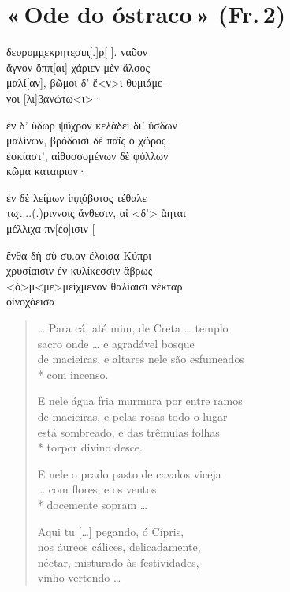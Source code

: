 \pagebreak
\section{«\,Ode do óstraco\,» (Fr.\,2)}

\begin{gkverse}
\dagger{}δευρυμμ̣εκρητε̣σιπ̣[.]ρ[̣ \quad].\dagger{} ναῦον\\
ἄγνον ὄππ̣[αι\quad] χάριεν μὲν ἄλσος\\
μαλί[αν], βῶμοι δ’ ἔ<ν>ι θυμιάμε-\\
νοι [λι]β̣ανώτω<ι>·

ἐν δ’ ὔδωρ ψῦχρον κελάδει δι’ ὔσδων\\
μαλίνων, βρόδοισι δὲ παῖς ὀ χῶρος\\
ἐσκίαστ’, αἰθυσσομένων δὲ φύλλων\\
κῶμα \dagger{}καταιριον·

ἐν δὲ λείμων ἰπ̣π̣όβοτος τέθαλε\\
\dagger{}τω̣τ...(.)ριννοις\dagger{} ἄνθεσιν, αἰ <δ’> ἄηται\\
μέλλιχα πν[έο]ισιν [\\
\quad[\qquad\qquad]

ἔνθα δὴ σὺ \dagger{}συ.αν\dagger{} ἔλοισα Κύπρι\\
χρυσίαισιν ἐν κυλίκεσσιν ἄβρως\\
<ὀ>μ<με>μείχμενον θαλίαισι νέκταρ\\
οἰνοχόεισα
\end{gkverse}

\begin{verse}
\ldots{} Para cá, até mim, de Creta \ldots{} templo\\
sacro onde \ldots{} e agradável bosque\\
de macieiras, e altares nele são esfumeados\\*
com incenso.

E nele água fria murmura por entre ramos\\
de macieiras, e pelas rosas todo o lugar\\
está sombreado, e das trêmulas folhas\\*
torpor divino desce.

E nele o prado pasto de cavalos viceja\\
\ldots{} com flores, e os ventos\\*
docemente sopram \ldots{}

Aqui tu [\ldots{}] pegando, ó Cípris,\\ \EP[1]
nos áureos cálices, delicadamente,\\
néctar, misturado às festividades,\\
vinho-vertendo \ldots{}
\end{verse}


